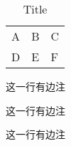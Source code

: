 
            \begin{table}
                \centering
                \caption{Title\protect\footnotemark}
                \begin{tabular}{l|l|l}
                    \hline
                    A&B&C\\
                    D&E&F\\
                    \hline
                \end{tabular}
            \end{table}

            
            

            这一行有边注

            {这一行有边注
            \reversemarginpar
            
            这一行有边注
            
            }

